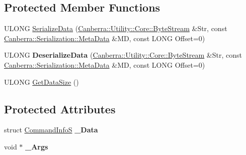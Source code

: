 \subsection*{Protected Member Functions}
\begin{DoxyCompactItemize}
\item 
U\+L\+O\+NG \hyperlink{class_canberra_1_1_data_types_1_1_application_1_1_command_data_a1233e7b3931f58f1fa084bc600907322_a1233e7b3931f58f1fa084bc600907322}{Serialize\+Data} (\hyperlink{class_canberra_1_1_utility_1_1_core_1_1_byte_stream}{Canberra\+::\+Utility\+::\+Core\+::\+Byte\+Stream} \&Str, const \hyperlink{class_canberra_1_1_serialization_1_1_meta_data}{Canberra\+::\+Serialization\+::\+Meta\+Data} \&MD, const L\+O\+NG Offset=0)
\item 
\mbox{\label{class_canberra_1_1_data_types_1_1_application_1_1_command_data_aca21f1998d26dd8a131617c341e6bdca}} 
U\+L\+O\+NG {\bfseries Deserialize\+Data} (\hyperlink{class_canberra_1_1_utility_1_1_core_1_1_byte_stream}{Canberra\+::\+Utility\+::\+Core\+::\+Byte\+Stream} \&Str, const \hyperlink{class_canberra_1_1_serialization_1_1_meta_data}{Canberra\+::\+Serialization\+::\+Meta\+Data} \&MD, const L\+O\+NG Offset=0)
\item 
U\+L\+O\+NG \hyperlink{class_canberra_1_1_data_types_1_1_application_1_1_command_data_a5f9db7c557a2554454494968d55ac00f_a5f9db7c557a2554454494968d55ac00f}{Get\+Data\+Size} ()
\end{DoxyCompactItemize}
\subsection*{Protected Attributes}
\begin{DoxyCompactItemize}
\item 
\mbox{\label{class_canberra_1_1_data_types_1_1_application_1_1_command_data_acd01748787544a3ab92c7fe0aa7077e5}} 
struct \hyperlink{struct_command_info_s}{Command\+InfoS} {\bfseries \+\_\+\+Data}
\item 
\mbox{\label{class_canberra_1_1_data_types_1_1_application_1_1_command_data_a44d96202af2ef9843c9d04a13fc143cd}} 
void $\ast$ {\bfseries \+\_\+\+Args}
\end{DoxyCompactItemize}
